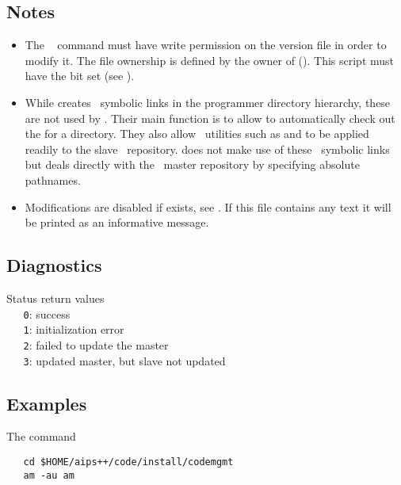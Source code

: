 \subsection*{Notes}

\begin{itemize}
\item
   The \rcs\  command must have write permission on the version
   file in order to modify it.  The file ownership is defined by the owner of
    ().  This script must have the
    bit set (see ).

\item
   While  creates \rcs\ symbolic links in the programmer
   directory hierarchy, these are not used by .  Their main function
   is to allow  to automatically check out the 
   for a directory.  They also allow \rcs\ utilities such as  and
    to be applied readily to the slave \rcs\ repository.
    does not make use of these \rcs\ symbolic links but deals directly
   with the \aipspp\ master repository by specifying absolute pathnames.

\item
   Modifications are disabled if  exists, see
   .  If this file contains any text it will be printed as an
   informative message.
\end{itemize}

\subsection*{Diagnostics}

Status return values
\\ \verb+   0+: success
\\ \verb+   1+: initialization error
\\ \verb+   2+: failed to update the master
\\ \verb+   3+: updated master, but slave not updated

\subsection*{Examples}

The command

\begin{verbatim}
   cd $HOME/aips++/code/install/codemgmt
   am -au am
\end{verbatim}

